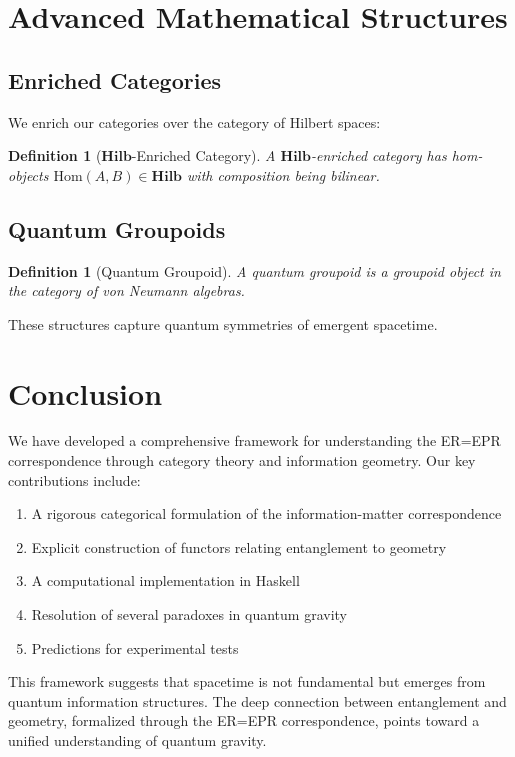 \documentclass[11pt,a4paper]{article}
\newtheorem{definition}[theorem]{Definition}
\newcommand{\Cat}[1]{\mathbf{#1}}
\newcommand{\Hom}{\text{Hom}}
\newcommand{\Hilb}{\Cat{Hilb}}
\begin{document}
\section{Advanced Mathematical Structures}

\subsection{Enriched Categories}

We enrich our categories over the category of Hilbert spaces:

\begin{definition}[$\Hilb$-Enriched Category]
A $\Hilb$-enriched category has hom-objects $\Hom(A,B) \in \Hilb$ with composition being bilinear.
\end{definition}

\subsection{Quantum Groupoids}

\begin{definition}[Quantum Groupoid]
A quantum groupoid is a groupoid object in the category of von Neumann algebras.
\end{definition}

These structures capture quantum symmetries of emergent spacetime.

\section{Conclusion}

We have developed a comprehensive framework for understanding the ER=EPR correspondence through category theory and information geometry. Our key contributions include:

\begin{enumerate}
\item A rigorous categorical formulation of the information-matter correspondence
\item Explicit construction of functors relating entanglement to geometry
\item A computational implementation in Haskell
\item Resolution of several paradoxes in quantum gravity
\item Predictions for experimental tests
\end{enumerate}

This framework suggests that spacetime is not fundamental but emerges from quantum information structures. The deep connection between entanglement and geometry, formalized through the ER=EPR correspondence, points toward a unified understanding of quantum gravity.
\end{document}
